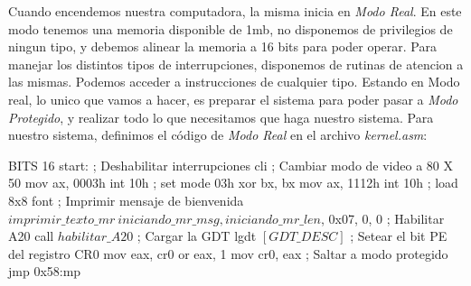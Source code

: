 Cuando encendemos nuestra computadora, la misma inicia en \textit{Modo Real}. En este modo tenemos una memoria disponible de 1mb, no disponemos de privilegios de ningun tipo, y debemos alinear la memoria a 16 bits para poder operar.
Para manejar los distintos tipos de interrupciones, disponemos de rutinas de atencion a las mismas. Podemos acceder a instrucciones de cualquier tipo.
Estando en Modo real, lo unico que vamos a hacer, es preparar el sistema para poder pasar a \textit{Modo Protegido}, y realizar todo lo que necesitamos que haga nuestro sistema.
Para nuestro sistema, definimos el c\'odigo de \textit{Modo Real} en el archivo \textit{kernel.asm}:

\begin{algorithmic}
\State \tab BITS 16
\State \tab start:
    \State \tab \tab ; Deshabilitar interrupciones
    \State \tab \tab cli
\newline
\State \tab \tab     ; Cambiar modo de video a 80 X 50
    \State \tab \tab mov ax, 0003h
    \State \tab \tab int 10h ; set mode 03h
    \State \tab \tab xor bx, bx
    \State \tab \tab mov ax, 1112h
    \State \tab \tab int 10h ; load 8x8 font
\newline
    \State \tab \tab ; Imprimir mensaje de bienvenida
    \State \tab \tab $imprimir\_texto\_mr \ iniciando\_mr\_msg, iniciando\_mr\_len$, 0x07, 0, 0
    \State \tab \tab ; Habilitar A20
    \State \tab \tab call $habilitar\_A20$
    \State \tab \tab ; Cargar la GDT
    \State \tab \tab lgdt $[GDT\_DESC]$
    \newline
    \State \tab \tab ; Setear el bit PE del registro CR0
    \State \tab \tab mov eax, cr0
    \State \tab \tab or eax, 1
    \State \tab \tab mov cr0, eax
    \newline
    \State \tab \tab ; Saltar a modo protegido
    \State \tab \tab jmp 0x58:mp

    \end{algorithmic}

